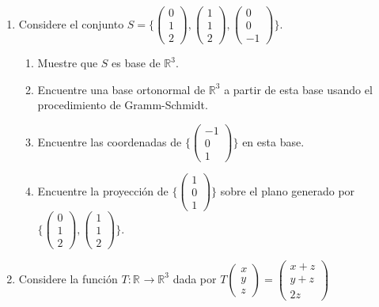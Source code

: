 \documentclass[12pt]{article}
\newcommand{\R}{\mathbb{R}}
\theoremstyle{exampstyle}
\theoremstyle{definition}
\theoremstyle{break}
\numberwithin{equation}{section}
\begin{document}
\begin{enumerate}
    \item Considere el conjunto $S=\{ \begin{pmatrix} 0 \\ 1 \\ 2 \end{pmatrix}, \begin{pmatrix} 1 \\ 1 \\ 2 \end{pmatrix}, \begin{pmatrix} 0 \\ 0 \\ -1 \end{pmatrix} \}$.
    \begin{enumerate}
        \item Muestre que $S$ es base de $\R^{3}$.
        \item Encuentre una base ortonormal de $\R^{3}$ a partir de esta base usando el procedimiento de Gramm-Schmidt.
        \item Encuentre las coordenadas de $\{ \begin{pmatrix} -1 \\0 \\ 1 \end{pmatrix} \}$ en esta base.    
    \item Encuentre la proyección de $\{ \begin{pmatrix} 1 \\ 0\\ 1 \end{pmatrix} \}$ sobre el plano generado por $\{ \begin{pmatrix} 0 \\ 1 \\ 2 \end{pmatrix}, \begin{pmatrix} 1 \\ 1 \\ 2 \end{pmatrix} \}$.

\end{enumerate} 
     
\item  Considere la función $T: \R^{} \to \R^{3}$ dada por $T \begin{pmatrix} x \\ y \\ z \end{pmatrix} = \begin{pmatrix}
    x+z \\ y+z \\ 2z 
\end{pmatrix}$


\end{enumerate}
\end{document}
